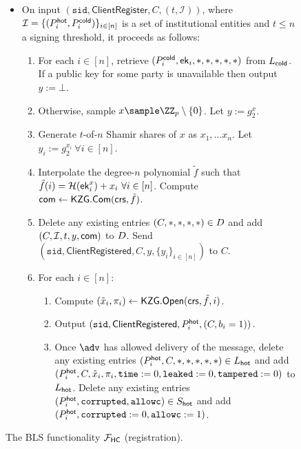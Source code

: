 \begin{figure*}
{{\begin{itemize}
    \item On input $(\texttt{sid},\mathsf{ClientRegister}, C, (t, \mathcal{I}))$, where $\mathcal{I} = \{(P_i^{\mathsf{hot}}, P_i^{\mathsf{cold}})\}_{i \in [n]}$ is a set of institutional entities and $t \leq n$ a signing threshold, it proceeds as follows:
        \begin{enumerate}
        \item For each $i \in [n]$, retrieve $(P_i^{\mathsf{cold}}, \mathsf{ek}_i, *, *, *, *, *)$ from $L_{\mathsf{cold}}$. If a public key for some party is unavailable then output $y := \bot$.
        \item Otherwise, sample $x \sample \ZZ_p \setminus \{0\}$. Let $y := g_2^x$.
        \item Generate $t$-of-$n$ Shamir shares of $x$ as $x_1, \ldots x_n$. Let $y_i := g_2^{x_i} ~\forall i \in [n]$.
        \item Interpolate the degree-$n$ polynomial $\tilde{f}$ such that $\tilde{f}(i) = \mathcal{H}(\mathsf{ek}_i^x) + x_i~\forall i \in [n]$. Compute $\mathsf{com} \gets \mathsf{KZG}.\mathsf{Com}(\mathsf{crs}, \tilde{f})$. %
        \item Delete any existing entries $(C, *, *, *, *) \in D$ and add $(C, \mathcal{I}, t, y, \mathsf{com})$ to $D$. Send $(\texttt{sid},\allowbreak \mathsf{ClientRegistered}, C, y, \{y_i\}_{i \in [n]})$ to $C$.
        \item For each $i \in [n]$:
        \begin{enumerate}
            \item Compute $(\tilde{x}_i, \pi_i) \gets \mathsf{KZG}.\mathsf{Open}(\mathsf{crs}, \tilde{f}, i)$. %
            \item Output $(\texttt{sid},\mathsf{ClientRegistered}, P_i^{\mathsf{hot}}, (C, b_i=1))$.
            \item Once $\adv$ has allowed delivery of the message, delete any existing entries $(P_i^{\mathsf{hot}}, C, *, *, *, *, *) \in L_{\mathsf{hot}}$ and add $(P_i^{\mathsf{hot}}, C, \tilde{x}_i, \pi_i, \texttt{time} := 0, \texttt{leaked} := 0,\allowbreak \texttt{tampered} := 0)$ to $L_{\mathsf{hot}}$. Delete any existing entries $(P_i^{\mathsf{hot}}, \texttt{corrupted}, \texttt{allowc}) \in S_{\mathsf{hot}}$ and add $(P_i^{\mathsf{hot}}, \texttt{corrupted} := 0, \texttt{allowc} := 1)$.
        \end{enumerate}
        \end{enumerate}
    \end{itemize}
    }}
    \caption{The BLS \hcwl functionality $\mathcal{F}_\mathsf{HC}$ (registration).}
        \label{fig:FSign1}
    \end{figure*}